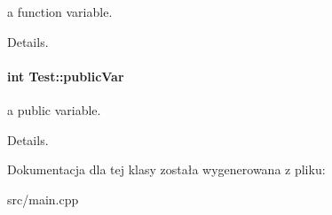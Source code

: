 a function variable. 

Details. \hypertarget{classTest_a3085f973ef857d85d647bf04e89760d0}{
\paragraph[{public\-Var}]{\setlength{\rightskip}{0pt plus 5cm}int Test\-::public\-Var}}\label{classTest_a3085f973ef857d85d647bf04e89760d0}


a public variable. 

Details. 

Dokumentacja dla tej klasy została wygenerowana z pliku\-:\begin{DoxyCompactItemize}
\item 
src/main.\-cpp\end{DoxyCompactItemize}
